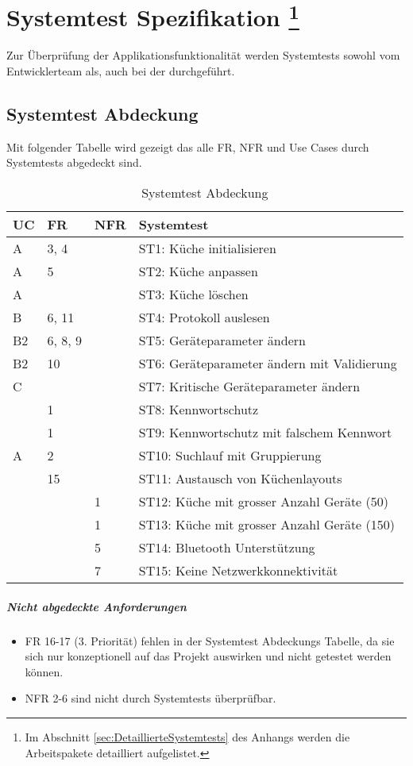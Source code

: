 \pagebreak
\section[Systemtest Spezifikation]{Systemtest Spezifikation \footnote{Im Abschnitt \ref{sec:DetaillierteSystemtests} des Anhangs werden die Arbeitspakete detailliert aufgelistet.}}
\label{s:Systemtest_Spezifikation}
Zur Überprüfung der Applikationsfunktionalität werden Systemtests sowohl vom Entwicklerteam als, auch bei der \fluxron{} durchgeführt. 

\subsection{Systemtest Abdeckung}
\label{sub:systemtest_abdeckung}
Mit folgender Tabelle wird gezeigt das alle \ac{FR}, \ac{NFR} und Use Cases durch Systemtests abgedeckt sind.

\begin{table}[H]
\begin{tabularx}{\textwidth}{ l | l | l | X}
\textbf{\acs{UC}}& \textbf{\acs{FR}} & \textbf{\acs{NFR}} &\textbf{Systemtest}\\ \hline
A  & 3, 4 & & ST1: Küche initialisieren \\ \hline
A  & 5 & & ST2: Küche anpassen \\ \hline
A  &  & & ST3: Küche löschen \\ \hline
B  & 6, 11 & &  ST4: Protokoll auslesen \\ \hline
B2 & 6, 8, 9 & &  ST5: Geräteparameter ändern \\ \hline
B2 & 10 & & ST6: Geräteparameter ändern mit Validierung \\ \hline
C  &  & &  ST7: Kritische Geräteparameter ändern \\ \hline
   & 1 & &  ST8: Kennwortschutz  \\ \hline
   & 1 & & ST9: Kennwortschutz mit falschem Kennwort \\ \hline
A  & 2 & &  ST10: Suchlauf mit Gruppierung \\ \hline
   & 15 & &  ST11: Austausch von Küchenlayouts \\ \hline
   & & 1 &  ST12: Küche mit grosser Anzahl Geräte (50) \\ \hline
   & & 1 &  ST13: Küche mit grosser Anzahl Geräte (150) \\ \hline
   & & 5 &  ST14: Bluetooth Unterstützung \\ \hline
   & & 7 &  ST15: Keine Netzwerkkonnektivität \\
\end{tabularx}
\caption{Systemtest Abdeckung}
\end{table}
\vspace{-1cm}
\subparagraph{Nicht abgedeckte Anforderungen}
\begin{itemize}
\item \ac{FR} 16-17 (3. Priorität) fehlen in der Systemtest Abdeckungs Tabelle, da sie sich nur konzeptionell auf das Projekt auswirken und nicht getestet werden können.
\item \ac{NFR} 2-6 sind nicht durch Systemtests überprüfbar.
\end{itemize}

